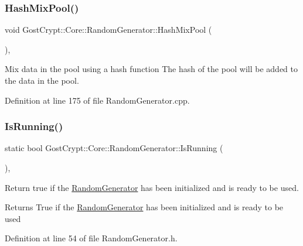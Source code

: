 \subsubsection{\texorpdfstring{Hash\+Mix\+Pool()}{HashMixPool()}}
{\footnotesize\ttfamily void Gost\+Crypt\+::\+Core\+::\+Random\+Generator\+::\+Hash\+Mix\+Pool (\begin{DoxyParamCaption}{ }\end{DoxyParamCaption})\hspace{0.3cm}{\ttfamily [static]}, {\ttfamily [protected]}}



Mix data in the pool using a hash function The hash of the pool will be added to the data in the pool. 



Definition at line 175 of file Random\+Generator.\+cpp.

\mbox{\label{class_gost_crypt_1_1_core_1_1_random_generator_acd2fafb9fdf7cae694f46726f53bb085}} 
\subsubsection{\texorpdfstring{Is\+Running()}{IsRunning()}}
{\footnotesize\ttfamily static bool Gost\+Crypt\+::\+Core\+::\+Random\+Generator\+::\+Is\+Running (\begin{DoxyParamCaption}{ }\end{DoxyParamCaption})\hspace{0.3cm}{\ttfamily [inline]}, {\ttfamily [static]}}



Return true if the \hyperlink{class_gost_crypt_1_1_core_1_1_random_generator}{Random\+Generator} has been initialized and is ready to be used. 

\begin{DoxyReturn}{Returns}
True if the \hyperlink{class_gost_crypt_1_1_core_1_1_random_generator}{Random\+Generator} has been initialized and is ready to be used 
\end{DoxyReturn}


Definition at line 54 of file Random\+Generator.\+h.

\mbox{\label{class_gost_crypt_1_1_core_1_1_random_generator_a310301edb2ca418f0b8b47ec0b398c3a}} 
